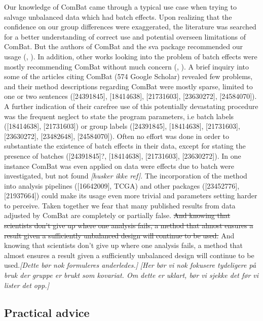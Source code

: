 \documentclass{bio}
\newcommand\COMMENT[2]{\textcolor{COMMENTcol}{#1}\NOTE{#2}} %
\newcommand\NB[1]{\textcolor{NBcol}{\textit{#1}}} %
\newcommand\NOTE[1]{\NB{[#1]}} %
\newcommand\CITE[1]{\textcolor{CITEcol}{[#1]}} %
\providecommand{\DIFdeltex}[1]{{\protect\color{red}\sout{#1}}}                      %
\providecommand{\DIFaddbegin}{} %
\providecommand{\DIFaddend}{} %
\providecommand{\DIFdelbegin}{} %
\providecommand{\DIFdelend}{} %
\providecommand{\DIFdel}[1]{\texorpdfstring{\DIFdeltex{#1}}{}} %
\begin{document}
Our knowledge of ComBat came through a typical use case when trying to salvage unbalanced data which had batch effects. Upon realizing that the confidence on our group differences were exaggerated, the literature was searched for a better understanding of correct use and potential overseen limitations of ComBat. But the authors of ComBat and the sva package recommended our usage (\citealp{Johnson2007}, \citealp{Leek2012}). In addition, other works looking into the problem of batch effects were mostly recommending ComBat without much concern (\citealp{Kupfer2012}, \citealp{Kitchen2011}). A brief inquiry into  some of the articles citing ComBat (574 Google Scholar) revealed few problems, and their method descriptions regarding ComBat were mostly sparse, limited to one or two sentences (\CITE{24391845}, \CITE{18414638}, \CITE{21731603}, \CITE{23630272}, \CITE{24584070}). A further indication of their carefree use of this potentially devastating procedure was the frequent neglect to state the program parameters, i.e batch labels (\CITE{18414638}, \CITE{21731603}) or group labels (\CITE{24391845}, \CITE{18414638}, \CITE{21731603}, \CITE{23630272}, \CITE{23482648}, \CITE{24584070}). Often no effort was done in order to substantiate the existence of batch effects in their data, except for stating the presence of batches (\CITE{24391845}?, \CITE{18414638}, \CITE{21731603}, \CITE{23630272}). In one instance ComBat was even applied on data were effects due to batch were investigated, but not found \NOTE{husker ikke ref}. The incorporation of the method into analysis pipelines (\CITE{16642009}, TCGA) and other packages (\CITE{23452776}, \CITE{21937664}) could make its usage even more trivial and parameters setting harder to perceive.
Taken together we fear that many published results from data adjusted by ComBat are completely or partially false. \DIFdelbegin \DIFdel{And knowing that scientists don't give up where one analysis fails, a method that almost ensures a result given a sufficiently unbalanced design will continue to be used.
}\DIFdelend \DIFaddbegin \COMMENT{And knowing that scientists don't give up where one analysis fails, a method that almost ensures a result given a sufficiently unbalanced design will continue to be used.}{Dette bør nok formuleres anderledes.} \NOTE{Her bør vi nok fokusere tydeligere på bruk der gruppe er brukt som kovariat. Om dette er uklart, bør vi sjekke det før vi lister det opp.}
\DIFaddend 


\subsection{Practical advice}
\end{document}
